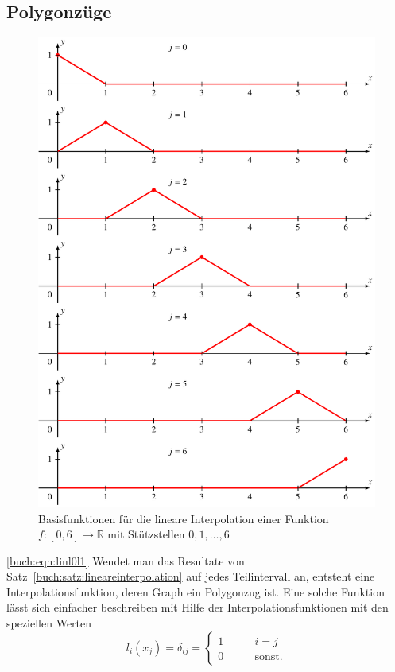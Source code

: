 \subsection{Polygonzüge
\label{buch:subsection:polygonzuege}}
\begin{figure}
\centering
\includegraphics{chapters/30-interpolation/figures/polygon.pdf}
\caption{Basisfunktionen für die lineare Interpolation einer 
Funktion $f\colon[0,6]\to\mathbb R$ mit Stützstellen $0,1,\dots,6$
\label{buch:figure:polygonbasis}}
\end{figure}
\eqref{buch:eqn:linl0l1}
Wendet man das Resultate von Satz~\ref{buch:satz:lineareinterpolation}
auf jedes Teilintervall an, entsteht eine Interpolationsfunktion, deren
Graph ein Polygonzug ist.
Eine solche Funktion lässt sich einfacher beschreiben mit Hilfe
der Interpolationsfunktionen mit den speziellen Werten
\begin{equation}
l_i(x_j) = \delta_{ij} =\begin{cases}
1&\qquad i=j\\
0&\qquad\text{sonst.}
\end{cases}
\label{buch:eqn:interpolation:basis}
\end{equation}
